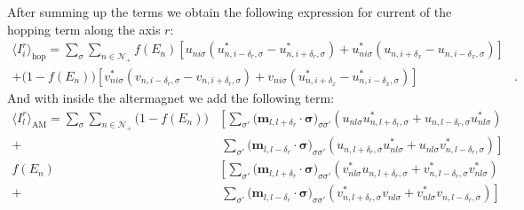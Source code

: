 \documentclass[../main.tex]{subfile}
\begin{document}
After summing up the terms we obtain the following expression for current of the hopping term along the axis $r$:
\begin{equation}
    \begin{aligned}
        \langle I_i^r\rangle_{\text{hop}} = \sum_{\sigma}\sum_{n\in\mathcal{N}_+} 
            f(E_n)\left[u_{ni\sigma}\left(u_{n,i-\delta_r,\sigma}^{\ast} - u_{n,i+\delta_r,\sigma}^{\ast}\right) + u_{ni\sigma}^{\ast}\left(u_{n,i+\delta_x} - u_{n,i-\delta_x,\sigma}\right)\right]&\\
            +\bigl(1-f(E_n)\bigr)\left[v_{ni\sigma}^{\ast}\left(v_{n,i-\delta_r,\sigma} - v_{n,i+\delta_r,\sigma}\right) + v_{ni\sigma}\left(u_{n,i+\delta_x}^{\ast} - u_{n,i-\delta_x,\sigma}^{\ast}\right)\right]&.
    \end{aligned}
\end{equation}
And with inside the altermagnet we add the following term:
\begin{equation*}
    \begin{aligned}
    \langle I_l^r\rangle_{\text{AM}} = \sum_{\sigma}\sum_{n\in\mathcal{N}_+} \bigl(1-f(E_n)) 
    &\left[ \sum _{\sigma'}\bigl(\bm{m}_{l,l+\delta_r}\cdot\bm{\sigma}\bigr)_{\sigma\sigma'} \left(u_{nl\sigma} u_{n,l+\delta_r,\sigma}^{\ast}  + u_{n,l-\delta_r,\sigma}u_{nl\sigma}^{\ast}\right)\right.\\
    +&~\left.\sum _{\sigma'}\bigl(\bm{m}_{l,l-\delta_r}\cdot\bm{\sigma}\bigr)_{\sigma\sigma'} \left(u_{n,l+\delta_r,\sigma} u_{nl\sigma}^{\ast} + u_{nl\sigma}v_{n,l-\delta_r,\sigma}^{\ast}\right)\right]\\
    f(E_n)&\left[ \sum _{\sigma'}\bigl(\bm{m}_{l,l+\delta_r}\cdot\bm{\sigma}\bigr)_{\sigma\sigma'} \left(v_{nl\sigma}^{\ast} u_{n,l+\delta_r,\sigma}  + v_{n,l-\delta_r,\sigma}^{\ast}v_{nl\sigma}^{\ast}\right)\right.\\
    +&~\left.\sum _{\sigma'}\bigl(\bm{m}_{l,l-\delta_r}\cdot\bm{\sigma}\bigr)_{\sigma\sigma'} \left(v_{n,l+\delta_r,\sigma}^{\ast} v_{nl\sigma} + v_{nl\sigma}^{\ast}v_{n,l-\delta_r,\sigma}\right)\right]
    \end{aligned}
\end{equation*}
\end{document}
